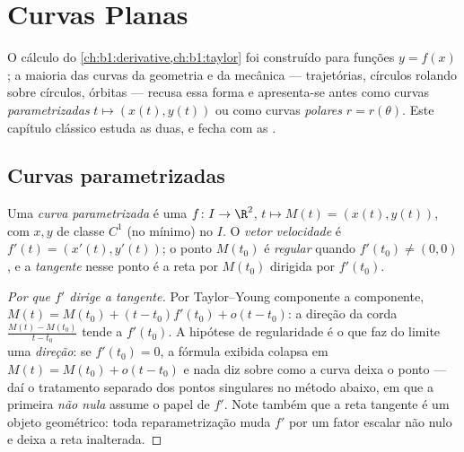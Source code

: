 \chapter{Curvas Planas}\label{ch:b1:curves}

O cálculo do \cref{ch:b1:derivative,ch:b1:taylor} foi construído para funções $y = f(x)$; a maioria das
curvas da geometria e da mecânica --- trajetórias, círculos rolando
sobre círculos, órbitas --- recusa essa forma e apresenta-se antes
como curvas \emph{parametrizadas} $t \mapsto (x(t),
y(t))$ ou como curvas \emph{polares}
$r = r(\theta)$. Este capítulo clássico estuda as duas, e fecha com as .

\section{Curvas parametrizadas}

\begin{definition}\label{def:b1:curves:def}
Uma \emph{curva parametrizada} é uma
 $f
\colon I \to \R^2$, $t \mapsto M(t) = (x(t), y(t))$, com $x, y$ de classe $C^1$ (no mínimo) no
 $I$. O \emph{vetor velocidade} é $f'(t) = (x'(t), y'(t))$; o ponto $M(t_0)$ é
\emph{regular} quando $f'(t_0) \neq (0,0)$, e a \emph{tangente} nesse ponto é a reta
por $M(t_0)$ dirigida por $f'(t_0)$.
\end{definition}

\begin{proof}[Por que $f'$ dirige a tangente]
Por Taylor--Young componente a componente, $M(t) = M(t_0) + (t - t_0) f'(t_0) +
o(t - t_0)$: a direção da corda
$\frac{M(t) - M(t_0)}{t - t_0}$ tende a $f'(t_0)$. A hipótese de regularidade é o que faz do
limite uma \emph{direção}: se $f'(t_0) = 0$, a fórmula exibida colapsa em
$M(t) = M(t_0) + o(t - t_0)$ e nada diz sobre como a curva deixa o ponto --- daí o
tratamento separado dos pontos singulares no método abaixo, em que a
primeira  \emph{não nula} assume o papel de $f'$. Note também
que a reta tangente é um objeto geométrico: toda reparametrização
muda $f'$ por um fator escalar não nulo e deixa a reta inalterada.
\end{proof}

